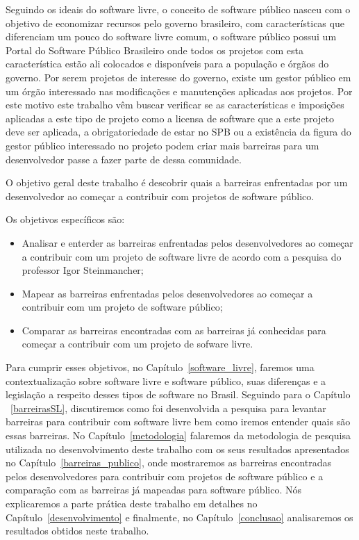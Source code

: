 Seguindo os ideais do software livre, o conceito de software público nasceu com o
objetivo de economizar recursos pelo governo brasileiro, com características que 
diferenciam um pouco do software livre comum, o software público possui um
Portal do Software Público Brasileiro onde todos os projetos com esta característica
estão ali colocados e disponíveis para a população e órgãos do governo. Por serem
projetos de interesse do governo, existe um gestor público em um órgão interessado 
nas modificações e manutenções aplicadas aos projetos. Por este motivo este trabalho 
vêm buscar verificar se as características e imposições aplicadas a este tipo de projeto 
como a licensa de software que a este projeto deve ser aplicada, a obrigatoriedade de
estar no SPB ou a existência da figura do gestor público interessado no projeto podem
criar mais barreiras para um desenvolvedor passe a fazer parte de dessa comunidade.


O objetivo geral deste trabalho é descobrir quais a barreiras enfrentadas por um 
desenvolvedor ao começar a contribuir com projetos de software público.

Os objetivos específicos são:

\begin{itemize}
\item Analisar e enterder as barreiras enfrentadas pelos desenvolvedores ao começar
a contribuir com um projeto de software livre de acordo com a pesquisa do professor
Igor Steinmancher;
\item Mapear as barreiras enfrentadas pelos desenvolvedores ao começar a contribuir
com um projeto de software público;
\item Comparar as barreiras encontradas com as barreiras já conhecidas para começar 
a contribuir com um projeto de sofware livre.
\end{itemize}

Para cumprir esses objetivos, no Capítulo~\ref{software_livre}, faremos uma 
contextualização sobre software livre e software público, suas diferenças e a 
legislação a respeito desses tipos de software no Brasil. Seguindo para o Capítulo
~\ref{barreirasSL}, discutiremos como foi desenvolvida a pesquisa para levantar
barreiras para contribuir com software livre bem como iremos entender quais são
essas barreiras. No Capítulo~\ref{metodologia} falaremos da metodologia de pesquisa
utilizada no desenvolvimento deste trabalho com os seus resultados apresentados no
Capítulo~\ref{barreiras_publico}, onde mostraremos as barreiras encontradas pelos
desenvolvedores para contribuir com projetos de software público e a comparação com 
as barreiras já mapeadas para software público. Nós explicaremos a parte prática deste
trabalho em detalhes no Capítulo~\ref{desenvolvimento} e finalmente, no Capítulo~\ref{conclusao}
analisaremos os resultados obtidos neste trabalho.


